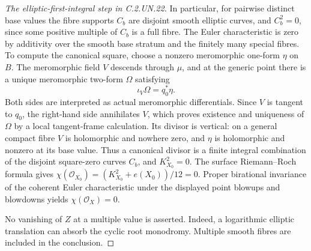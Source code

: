 \begin{proof}[The elliptic-first-integral step in C.2.UN.22]
In particular, for pairwise distinct base values the
fibre supports $C_b$ are disjoint smooth elliptic
curves, and $C_b^2=0$, since some positive multiple
of $C_b$ is a full fibre.  The Euler characteristic
is zero by additivity over the smooth base stratum
and the finitely many special fibres.  To compute
the canonical square, choose a nonzero meromorphic
one-form $\eta$ on $B$.  The meromorphic field $V$
descends through $\mu$, and at the generic point
there is a unique meromorphic two-form $\Omega$
satisfying
\[
 \iota_V\Omega=q_0^*\eta.
 \tag{C.RF.4}
\]
Both sides are interpreted as actual meromorphic
differentials.  Since $V$ is tangent to $q_0$, the
right-hand side annihilates $V$, which proves
existence and uniqueness of $\Omega$ by a local
tangent-frame calculation.  Its divisor is
vertical: on a general compact fibre $V$ is
holomorphic and nowhere zero, and $\eta$ is
holomorphic and nonzero at its base value.
Thus a canonical divisor is a finite integral
combination of the disjoint square-zero curves
$C_b$, and $K_{X_0}^2=0$.  The surface
Riemann--Roch formula gives
$\chi(\mathcal O_{X_0})=(K_{X_0}^2+e(X_0))/12=0$.
Proper birational invariance of the coherent
Euler characteristic under the displayed point
blowups and blowdowns yields
$\chi(\mathcal O_X)=0$.

No vanishing of $Z$ at a multiple value is asserted.
Indeed, a logarithmic elliptic translation can absorb
the cyclic root monodromy.  Multiple smooth fibres
are included in the conclusion.
\end{proof}

